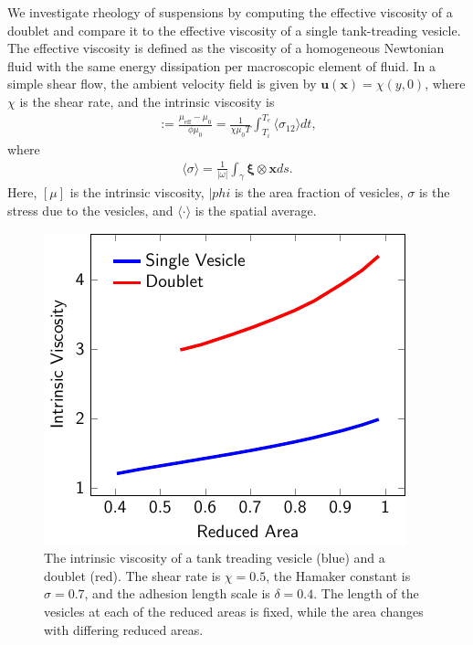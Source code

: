 \documentclass[%
preprint,
 amsmath,amssymb,
 aps,
]{revtex4-1}
\newcommand{\uu}{\mathbf{u}}
\newcommand{\xx}{\mathbf{x}}
\newcommand{\xxi}{\boldsymbol{\xi}}
\begin{document}
We investigate rheology of suspensions by computing the effective
viscosity of a doublet and compare it to the effective viscosity of a
single tank-treading vesicle. The effective viscosity is defined as the
viscosity of a homogeneous Newtonian fluid with the same energy
dissipation per macroscopic element of fluid.  In a simple shear flow,
the ambient velocity field is given by $\uu(\xx) = \chi(y,0)$, where
$\chi$ is the shear rate, and the intrinsic viscosity is
\begin{align*}
  [\mu]:= \frac{\mu_{\mathrm{eff}} - \mu_0}{\phi \mu_0} = 
  \frac{1}{\chi \mu_0 T} \int_{T_i}^{T_e} 
  \langle \sigma_{12} \rangle dt,
\end{align*}
where
\begin{align*}
  \langle \sigma \rangle = \frac{1}{|\omega|} \int_{\gamma}
    \xxi \otimes \xx ds.
\end{align*}
Here, $[\mu]$ is the intrinsic viscosity, $|phi$ is the area fraction of
vesicles, $\sigma$ is the stress due to the vesicles, and $\langle \cdot
\rangle$ is the spatial average.

\begin{figure}[htp]
  \includegraphics[scale=1]{figs/shear2Ves_adR4em1adS7em1Chi5em1.pdf}
  \caption{\label{fig:shearIntrinsicViscosity} The intrinsic viscosity
  of a tank treading vesicle (blue) and a doublet (red).  The shear rate
is $\chi = 0.5$, the Hamaker constant is $\sigma = 0.7$, and the
adhesion length scale is $\delta = 0.4$.  The length of the vesicles at
each of the reduced areas is fixed, while the area changes with
differing reduced areas.}
\end{figure}
\end{document}
